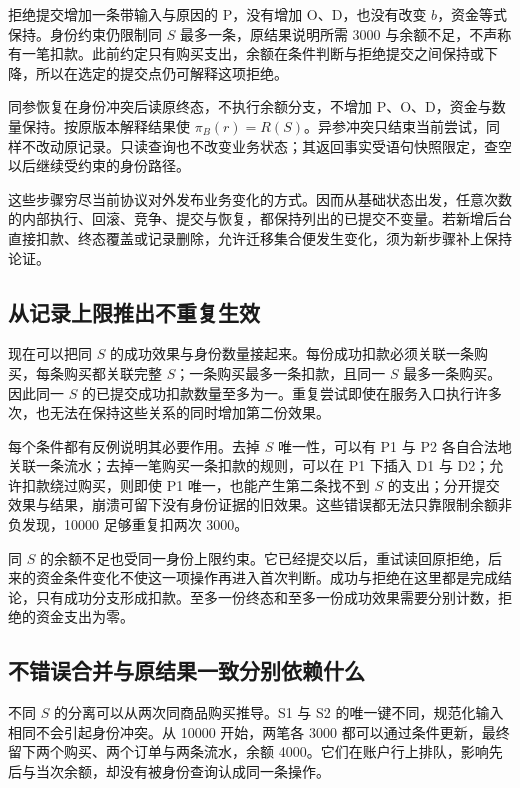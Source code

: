 


拒绝提交增加一条带输入与原因的 P，没有增加 O、D，也没有改变 \(b\)，资金等式保持。身份约束仍限制同 \(S\) 最多一条，原结果说明所需 3000 与余额不足，不声称有一笔扣款。此前约定只有购买支出，余额在条件判断与拒绝提交之间保持或下降，所以在选定的提交点仍可解释这项拒绝。

同参恢复在身份冲突后读原终态，不执行余额分支，不增加 P、O、D，资金与数量保持。按原版本解释结果使 \(\pi_B(r)=R(S)\)。异参冲突只结束当前尝试，同样不改动原记录。只读查询也不改变业务状态；其返回事实受语句快照限定，查空以后继续受约束的身份路径。

这些步骤穷尽当前协议对外发布业务变化的方式。因而从基础状态出发，任意次数的内部执行、回滚、竞争、提交与恢复，都保持列出的已提交不变量。若新增后台直接扣款、终态覆盖或记录删除，允许迁移集合便发生变化，须为新步骤补上保持论证。

\subsection*{从记录上限推出不重复生效}

现在可以把同 \(S\) 的成功效果与身份数量接起来。每份成功扣款必须关联一条购买，每条购买都关联完整 \(S\)；一条购买最多一条扣款，且同一 \(S\) 最多一条购买。因此同一 \(S\) 的已提交成功扣款数量至多为一。重复尝试即使在服务入口执行许多次，也无法在保持这些关系的同时增加第二份效果。

每个条件都有反例说明其必要作用。去掉 \(S\) 唯一性，可以有 P1 与 P2 各自合法地关联一条流水；去掉一笔购买一条扣款的规则，可以在 P1 下插入 D1 与 D2；允许扣款绕过购买，则即使 P1 唯一，也能产生第二条找不到 \(S\) 的支出；分开提交效果与结果，崩溃可留下没有身份证据的旧效果。这些错误都无法只靠限制余额非负发现，10000 足够重复扣两次 3000。

同 \(S\) 的余额不足也受同一身份上限约束。它已经提交以后，重试读回原拒绝，后来的资金条件变化不使这一项操作再进入首次判断。成功与拒绝在这里都是完成结论，只有成功分支形成扣款。至多一份终态和至多一份成功效果需要分别计数，拒绝的资金支出为零。

\subsection*{不错误合并与原结果一致分别依赖什么}

不同 \(S\) 的分离可以从两次同商品购买推导。S1 与 S2 的唯一键不同，规范化输入相同不会引起身份冲突。从 10000 开始，两笔各 3000 都可以通过条件更新，最终留下两个购买、两个订单与两条流水，余额 4000。它们在账户行上排队，影响先后与当次余额，却没有被身份查询认成同一条操作。

